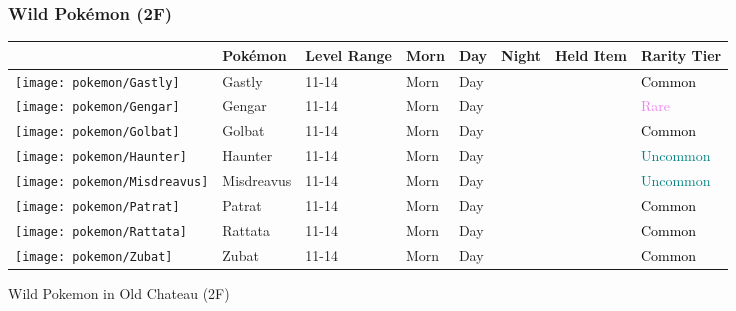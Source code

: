 \subsubsection{Wild Pokémon (2F)}%
\label{ssubsec:WildPokmon(2F)}%
\begin{longtable}{||l l l l l l l l||}%
\hline%
&Pokémon&Level Range&Morn&Day&Night&Held Item&Rarity Tier\\%
\hline%
\endhead%
\hline%
\texttt{[image: pokemon/Gastly]}&Gastly&11{-}14&Morn&Day&&&\textcolor{black}{%
Common%
}\\%
\hline%
\texttt{[image: pokemon/Gengar]}&Gengar&11{-}14&Morn&Day&&&\textcolor{violet}{%
Rare%
}\\%
\hline%
\texttt{[image: pokemon/Golbat]}&Golbat&11{-}14&Morn&Day&&&\textcolor{black}{%
Common%
}\\%
\hline%
\texttt{[image: pokemon/Haunter]}&Haunter&11{-}14&Morn&Day&&&\textcolor{teal}{%
Uncommon%
}\\%
\hline%
\texttt{[image: pokemon/Misdreavus]}&Misdreavus&11{-}14&Morn&Day&&&\textcolor{teal}{%
Uncommon%
}\\%
\hline%
\texttt{[image: pokemon/Patrat]}&Patrat&11{-}14&Morn&Day&&&\textcolor{black}{%
Common%
}\\%
\hline%
\texttt{[image: pokemon/Rattata]}&Rattata&11{-}14&Morn&Day&&&\textcolor{black}{%
Common%
}\\%
\hline%
\texttt{[image: pokemon/Zubat]}&Zubat&11{-}14&Morn&Day&&&\textcolor{black}{%
Common%
}\\%
\hline%
\end{longtable}%
\caption{Wild Pokemon in Old Chateau (2F)}